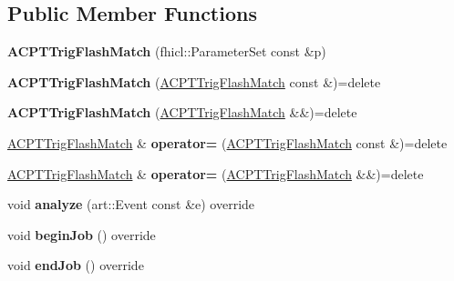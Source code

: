 \subsection*{Public Member Functions}
\begin{DoxyCompactItemize}
\item 
\hypertarget{classACPTTrigFlashMatch_a023bad289ce905162bf51061a9ea8a57}{{\bfseries A\-C\-P\-T\-Trig\-Flash\-Match} (fhicl\-::\-Parameter\-Set const \&p)}\label{classACPTTrigFlashMatch_a023bad289ce905162bf51061a9ea8a57}

\item 
\hypertarget{classACPTTrigFlashMatch_a7163ff6a902f715eb65241e9ef29a5d7}{{\bfseries A\-C\-P\-T\-Trig\-Flash\-Match} (\hyperlink{classACPTTrigFlashMatch}{A\-C\-P\-T\-Trig\-Flash\-Match} const \&)=delete}\label{classACPTTrigFlashMatch_a7163ff6a902f715eb65241e9ef29a5d7}

\item 
\hypertarget{classACPTTrigFlashMatch_a4076bcb46f4d41fa115392321797bc9f}{{\bfseries A\-C\-P\-T\-Trig\-Flash\-Match} (\hyperlink{classACPTTrigFlashMatch}{A\-C\-P\-T\-Trig\-Flash\-Match} \&\&)=delete}\label{classACPTTrigFlashMatch_a4076bcb46f4d41fa115392321797bc9f}

\item 
\hypertarget{classACPTTrigFlashMatch_a838017cf67fc68be164910cc77a0cc74}{\hyperlink{classACPTTrigFlashMatch}{A\-C\-P\-T\-Trig\-Flash\-Match} \& {\bfseries operator=} (\hyperlink{classACPTTrigFlashMatch}{A\-C\-P\-T\-Trig\-Flash\-Match} const \&)=delete}\label{classACPTTrigFlashMatch_a838017cf67fc68be164910cc77a0cc74}

\item 
\hypertarget{classACPTTrigFlashMatch_a157f0419b2b3a93cf06551989e694b4d}{\hyperlink{classACPTTrigFlashMatch}{A\-C\-P\-T\-Trig\-Flash\-Match} \& {\bfseries operator=} (\hyperlink{classACPTTrigFlashMatch}{A\-C\-P\-T\-Trig\-Flash\-Match} \&\&)=delete}\label{classACPTTrigFlashMatch_a157f0419b2b3a93cf06551989e694b4d}

\item 
\hypertarget{classACPTTrigFlashMatch_ac752939160dfab34cdd0741a7f715eec}{void {\bfseries analyze} (art\-::\-Event const \&e) override}\label{classACPTTrigFlashMatch_ac752939160dfab34cdd0741a7f715eec}

\item 
\hypertarget{classACPTTrigFlashMatch_ab182358806d46b65d6836573eb4f957d}{void {\bfseries begin\-Job} () override}\label{classACPTTrigFlashMatch_ab182358806d46b65d6836573eb4f957d}

\item 
\hypertarget{classACPTTrigFlashMatch_ae186ed9ccbcbdab43ee65cc856a75c87}{void {\bfseries end\-Job} () override}\label{classACPTTrigFlashMatch_ae186ed9ccbcbdab43ee65cc856a75c87}

\end{DoxyCompactItemize}
